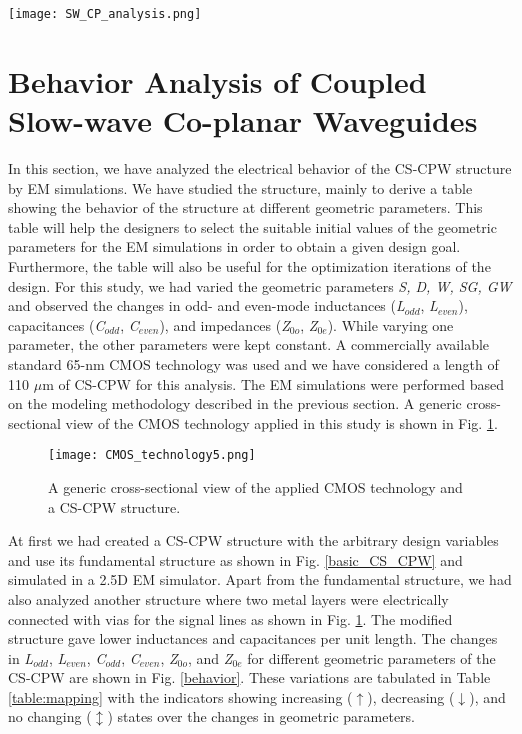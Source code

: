 \documentclass[journal]{IEEEtran}
\begin{document}
\begin{figure*}
	\texttt{[image: SW\_CP\_analysis.png]}
	\caption{Simplified representation of modeling a coupled slow-wave coplanar waveguide.}
	\label{modeling_method}
\end{figure*}


\section{Behavior Analysis of Coupled Slow-wave Co-planar Waveguides}

In this section, we have analyzed the electrical behavior of the CS-CPW structure by EM
simulations. We have studied the structure, mainly to derive a table showing the behavior of the structure at different geometric parameters. This table will help the designers to select the suitable initial values of the geometric parameters for the EM simulations in order to obtain a given design goal. Furthermore, the table will also be useful for the optimization iterations of the design. 
For this study, we had varied the geometric parameters \textit{S, D, W, SG, GW} and observed the changes in odd- and even-mode inductances (\textit{L$_{odd}$}, \textit{L$_{even}$}), capacitances (\textit{C$_{odd}$}, \textit{C$_{even}$}), and impedances (\textit{Z$_{0o}$}, \textit{Z$_{0e}$}). While varying one parameter, the other parameters were kept constant. A commercially available standard 65-nm CMOS technology was used and we have considered a length of 110 $\mu$m of CS-CPW for this analysis. The EM simulations were performed based on the modeling methodology described in the previous section. A generic cross-sectional view of the CMOS technology applied in this study is shown in Fig. \ref{tech_cross}.

\begin{figure}
	\texttt{[image: CMOS\_technology5.png]}
	\caption{A generic cross-sectional view of the applied CMOS technology and a CS-CPW structure.}
	\label{tech_cross}
\end{figure}

At first we had created a CS-CPW structure with the arbitrary design variables and use its fundamental structure as shown in Fig. \ref{basic_CS_CPW} and simulated in a 2.5D EM simulator. Apart from the fundamental structure, we had also analyzed another structure where two metal layers were electrically connected with vias for the signal lines as shown in Fig. \ref{tech_cross}. The modified structure gave lower inductances and capacitances per unit length. The changes in \textit{L$_{odd}$}, \textit{L$_{even}$}, \textit{C$_{odd}$}, \textit{C$_{even}$}, \textit{Z$_{0o}$}, and \textit{Z$_{0e}$} for different geometric parameters of the CS-CPW are shown in Fig. \ref{behavior}. These variations are tabulated in Table \ref{table:mapping} with the indicators showing increasing ($\uparrow$), decreasing ($\downarrow$), and no changing ($\updownarrow$) states over the changes in geometric parameters.
\end{document}
